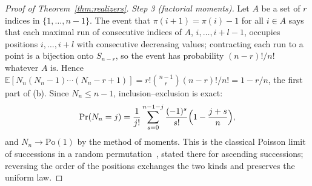 \documentclass[11pt,a4paper]{article}
\theoremstyle{plain}
\theoremstyle{definition}
\theoremstyle{remark}
\begin{document}
\begin{proof}[Proof of Theorem~\ref{thm:realizers}]
\emph{Step 3 (factorial moments).} Let $A$ be a set of $r$ indices in $\{1,\dots,n-1\}$. The event that $\pi(i+1)=\pi(i)-1$ for all $i\in A$ says that each maximal run of consecutive indices of $A$, $i,\dots,i+l-1$, occupies positions $i,\dots,i+l$ with consecutive decreasing values; contracting each run to a point is a bijection onto $S_{n-r}$, so the event has probability $(n-r)!/n!$ whatever $A$ is. Hence $\mathbb E[N_n(N_n-1)\cdots(N_n-r+1)]=r!\binom{n-1}r(n-r)!/n!=1-r/n$, the first part of (b). Since $N_n\le n-1$, inclusion--exclusion is exact:
\[
\Pr(N_n=j)=\frac1{j!}\sum_{s=0}^{n-1-j}\frac{(-1)^s}{s!}\Bigl(1-\frac{j+s}n\Bigr),
\]
and $N_n\to\mathrm{Po}(1)$ by the method of moments. This is the classical Poisson limit of successions in a random permutation~\citep{wolfowitz1944,kaplansky1945}, stated there for ascending successions; reversing the order of the positions exchanges the two kinds and preserves the uniform law.
\end{proof}
\end{document}
